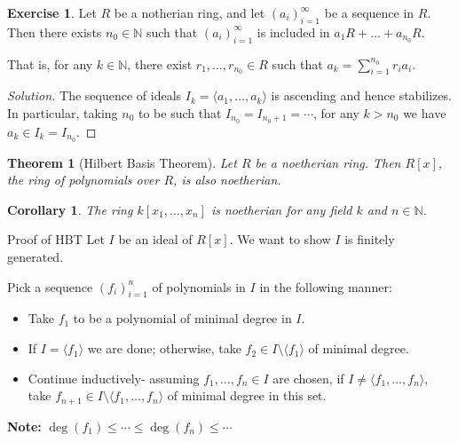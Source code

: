 \documentclass[12pt, draft,reqno,a4paper, twoside]{beamer}
\theoremstyle{plain}
\newtheorem{theo}{Theorem}
\newtheorem{corol}{Corollary}
\theoremstyle{definition}
\newtheorem{exer}{Exercise}
\newcommand{\dbN}{\mathbb N}
\newcommand{\gen}[1]{\langle{#1}\rangle}
\begin{document}
\begin{frame}
	\begin{exer}
		Let $R$ be a notherian ring, and let $(a_i)_{i=1}^\infty$ be a sequence in $R$. Then there exists $n_0\in\dbN$ such that $(a_i)_{i=1}^\infty$ is included in $a_1R+\ldots+a_{n_0}R$.
		
		 That is, for any $k\in\dbN$, there exist $r_1,\ldots,r_{n_0}\in R$ such that $a_k=\sum_{i=1}^{n_0}r_i a_i$.
	\end{exer}
	\begin{proof}[Solution]
		The sequence of ideals $I_k=\gen{a_1,\ldots,a_k}$ is ascending and hence stabilizes. In particular, taking $n_0$ to be such that $I_{n_0}=I_{n_0+1}=\cdots$, for any $k>n_0$ we have $a_k\in I_k=I_{n_0}$. 
	\end{proof}
\end{frame}

\begin{frame}
	\begin{theo}[Hilbert Basis Theorem]
		Let $R$ be a noetherian ring. Then $R[x]$, the ring of polynomials over $R$, is also noetherian.
	\end{theo}	
	\begin{corol}
		The ring $k[x_1,\ldots,x_n]$ is noetherian for any field $k$ and $n\in\dbN$.
	\end{corol}
\end{frame}

\begin{frame}{Proof of HBT}
	Let $I$ be an ideal of $R[x]$. \onslide<2-> We want to show $I$ is finitely generated.

 Pick a sequence $(f_i)_{i=1}^n$ of polynomials in $I$ in the following manner:
\begin{itemize}
	\item<4-> Take $f_1$ to be a polynomial of minimal degree in $I$.
	\item<5-> If $I=\gen{f_1}$ we are done; otherwise, take $f_2\in I\setminus\gen{f_1}$ of minimal degree.
	\item<6-> Continue inductively- assuming $f_1,\ldots,f_n\in I$ are chosen, if $I\ne\gen{f_1,\ldots,f_n}$, take $f_{n+1}\in I\setminus\gen{f_1,\ldots,f_n}$ of minimal degree in this set. 
\end{itemize}
	 \textbf{Note:} $\deg(f_1)\le\cdots\le\deg(f_n)\le\cdots$
\end{frame}
\end{document}
